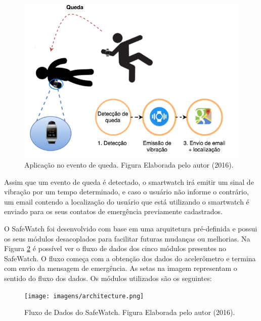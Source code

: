 \begin{figure}[ht]
	\centering
	\includegraphics[scale=0.5]{imagens/DiagramaQueda.png}
	\caption{Aplicação no evento de queda. Figura Elaborada pelo autor (2016).}
	\label{fig:diagram}
\end{figure}



Assim que um evento de queda é detectado, o smartwatch irá emitir um sinal de vibração por um tempo determinado, e caso o usuário não informe o contrário, um email contendo a localização do usuário que está utilizando o smartwatch é enviado para os seus contatos de emergência previamente cadastrados.

O SafeWatch foi desenvolvido com base em uma arquitetura pré-definida e possui os seus módulos desacoplados para facilitar futuras mudanças ou melhorias. Na Figura \ref{fig:architecture} é possível ver o fluxo de dados dos cinco módulos presentes no SafeWatch. O fluxo começa com a obtenção dos dados do acelerômetro e termina com envio da mensagem de emergência. As setas na imagem representam o sentido do fluxo dos dados. Os módulos utilizados são os seguintes:


 \begin{figure}
 	\centering
 	\texttt{[image: imagens/architecture.png]}
 	\caption{ Fluxo de Dados do SafeWatch. Figura Elaborada pelo autor (2016).}
 	\label{fig:architecture}
 \end{figure} 


